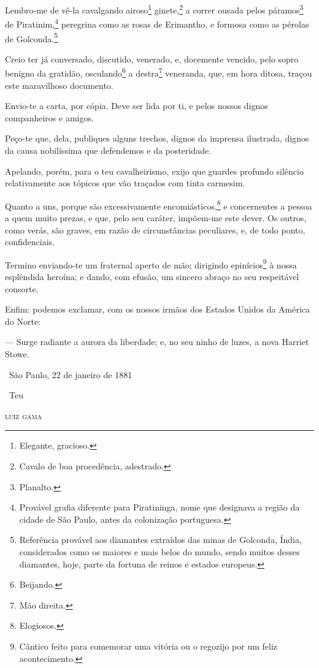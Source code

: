 Lembro-me de vê-la cavalgando airoso\footnote{Elegante, gracioso.}
ginete,\footnote{Cavalo de boa procedência, adestrado.} a correr
ousada pelos páramos\footnote{Planalto.} de Piratinim,\footnote{
  Provável grafia diferente para Piratininga, nome que designava a
  região da cidade de São Paulo, antes da colonização portuguesa.}
peregrina como as rosas de Erimantho, e formosa como as pérolas de
Golconda.\footnote{Referência provável aos diamantes extraídos das
  minas de Golconda, Índia, considerados como os maiores e mais belos do
  mundo, sendo muitos desses diamantes, hoje, parte da fortuna de reinos
  e estados europeus.}

Creio ter já conversado, discutido, venerado, e, docemente vencido, pelo
sopro benigno da gratidão, osculando\footnote{Beijando.} a
destra\footnote{Mão direita.} veneranda, que, em hora ditosa, traçou
este maravilhoso documento.

Envio-te a carta, por cópia. Deve ser lida por ti, e pelos nossos dignos
companheiros e amigos.

Peço-te que, dela, publiques alguns trechos, dignos da imprensa
ilustrada, dignos da causa nobilíssima que defendemos e da posteridade.

Apelando, porém, para o teu cavalheirismo, exijo que guardes profundo
silêncio relativamente aos tópicos que vão traçados com tinta carmesim.

Quanto a uns, porque são excessivamente encomiásticos,\footnote{
  Elogiosos.} e concernentes a pessoa a quem muito prezas, e que, pelo
seu caráter, impõem-me este dever. Os outros, como verás, são graves, em
razão de circunstâncias peculiares, e, de todo ponto, confidenciais.

Termino enviando-te um fraternal aperto de mão; dirigindo
epinícios\footnote{Cântico feito para comemorar uma vitória ou o
  regozijo por um feliz acontecimento.} à nossa esplêndida heroína; e
dando, com efusão, um sincero abraço no seu respeitável consorte.

Enfim: podemos exclamar, com os nossos irmãos dos Estados Unidos da
América do Norte:

--- Surge radiante a aurora da liberdade; e, no seu ninho de luzes, a
nova Harriet Stowe.\medskip

\hfill\ São Paulo, 22 de janeiro de 1881

\hfill\ Teu

\hfill\textsc{luiz gama}

\asterisc

